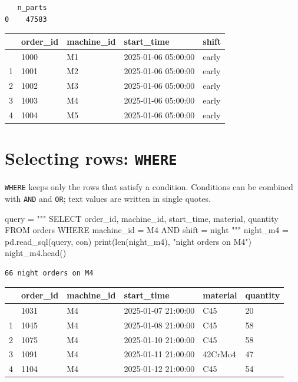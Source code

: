 \documentclass[
  letterpaper,
  DIV=11,
  numbers=noendperiod]{scrreprt}
\newenvironment{Shaded}{\begin{snugshade}}{\end{snugshade}}
\newcommand{\BuiltInTok}[1]{\textcolor[rgb]{0.00,0.23,0.31}{#1}}
\newcommand{\NormalTok}[1]{\textcolor[rgb]{0.00,0.23,0.31}{#1}}
\newcommand{\OperatorTok}[1]{\textcolor[rgb]{0.37,0.37,0.37}{#1}}
\newcommand{\StringTok}[1]{\textcolor[rgb]{0.13,0.47,0.30}{#1}}
\begin{document}
\begin{verbatim}
   n_parts
0    47583
\end{verbatim}

\begin{longtable}[]{@{}lllll@{}}
\toprule\noalign{}
& order\_id & machine\_id & start\_time & shift \\
\midrule\noalign{}
\endhead
\bottomrule\noalign{}
\endlastfoot
0 & 1000 & M1 & 2025-01-06 05:00:00 & early \\
1 & 1001 & M2 & 2025-01-06 05:00:00 & early \\
2 & 1002 & M3 & 2025-01-06 05:00:00 & early \\
3 & 1003 & M4 & 2025-01-06 05:00:00 & early \\
4 & 1004 & M5 & 2025-01-06 05:00:00 & early \\
\end{longtable}

\section{\texorpdfstring{Selecting rows:
\texttt{WHERE}}{Selecting rows: WHERE}}\label{selecting-rows-where}

\texttt{WHERE} keeps only the rows that satisfy a condition. Conditions
can be combined with \texttt{AND} and \texttt{OR}; text values are
written in single quotes.

\begin{Shaded}
\begin{Highlighting}[]
\NormalTok{query }\OperatorTok{=} \StringTok{"""}
\StringTok{SELECT order\_id, machine\_id, start\_time, material, quantity}
\StringTok{FROM orders}
\StringTok{WHERE machine\_id = \textquotesingle{}M4\textquotesingle{} AND shift = \textquotesingle{}night\textquotesingle{}}
\StringTok{"""}
\NormalTok{night\_m4 }\OperatorTok{=}\NormalTok{ pd.read\_sql(query, con)}
\BuiltInTok{print}\NormalTok{(}\BuiltInTok{len}\NormalTok{(night\_m4), }\StringTok{"night orders on M4"}\NormalTok{)}
\NormalTok{night\_m4.head()}
\end{Highlighting}
\end{Shaded}

\begin{verbatim}
66 night orders on M4
\end{verbatim}

\begin{longtable}[]{@{}llllll@{}}
\toprule\noalign{}
& order\_id & machine\_id & start\_time & material & quantity \\
\midrule\noalign{}
\endhead
\bottomrule\noalign{}
\endlastfoot
0 & 1031 & M4 & 2025-01-07 21:00:00 & C45 & 20 \\
1 & 1045 & M4 & 2025-01-08 21:00:00 & C45 & 58 \\
2 & 1075 & M4 & 2025-01-10 21:00:00 & C45 & 58 \\
3 & 1091 & M4 & 2025-01-11 21:00:00 & 42CrMo4 & 47 \\
4 & 1104 & M4 & 2025-01-12 21:00:00 & C45 & 54 \\
\end{longtable}
\end{document}
